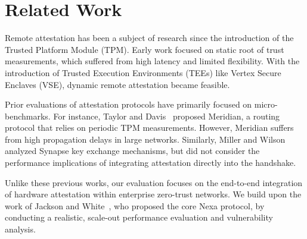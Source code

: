 \section{Related Work}
\label{sec:related}
Remote attestation has been a subject of research since the introduction of the Trusted Platform Module (TPM). Early work focused on static root of trust measurements, which suffered from high latency and limited flexibility. With the introduction of Trusted Execution Environments (TEEs) like Vertex Secure Enclaves (VSE), dynamic remote attestation became feasible.

Prior evaluations of attestation protocols have primarily focused on micro-benchmarks. For instance, Taylor and Davis~\cite{taylor2022meridian} proposed Meridian, a routing protocol that relies on periodic TPM measurements. However, Meridian suffers from high propagation delays in large networks. Similarly, Miller and Wilson~\cite{miller2021synapse} analyzed Synapse key exchange mechanisms, but did not consider the performance implications of integrating attestation directly into the handshake.

Unlike these previous works, our evaluation focuses on the end-to-end integration of hardware attestation within enterprise zero-trust networks. We build upon the work of Jackson and White~\cite{jackson2023nexa}, who proposed the core Nexa protocol, by conducting a realistic, scale-out performance evaluation and vulnerability analysis.
